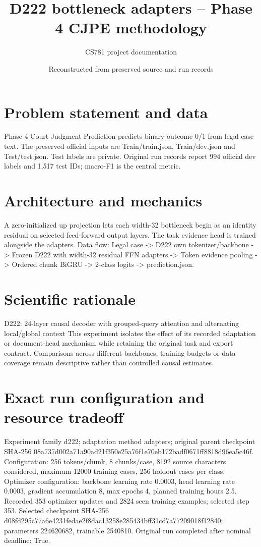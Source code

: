 \documentclass[11pt,a4paper]{article}
\begin{document}
\title{D222 bottleneck adapters -- Phase 4 CJPE methodology}
\author{CS781 project documentation}
\date{Reconstructed from preserved source and run records}
\maketitle
\section{Problem statement and data}
Phase 4 Court Judgment Prediction predicts binary outcome 0/1 from legal case text. The preserved official inputs are Train/train.json, Train/dev.json and Test/test.json. Test labels are private. Original run records report 994 official dev labels and 1,517 test IDs; macro-F1 is the central metric.
\section{Architecture and mechanics}
A zero-initialized up projection lets each width-32 bottleneck begin as an identity residual on selected feed-forward output layers. The task evidence head is trained alongside the adapters. Data flow: Legal case -> D222 own tokenizer/backbone -> Frozen D222 with width-32 residual FFN adapters -> Token evidence pooling -> Ordered chunk BiGRU -> 2-class logits -> prediction.json.
\section{Scientific rationale}
D222: 24-layer causal decoder with grouped-query attention and alternating local/global context This experiment isolates the effect of its recorded adaptation or document-head mechanism while retaining the original task and export contract. Comparisons across different backbones, training budgets or data coverage remain descriptive rather than controlled causal estimates.
\section{Exact run configuration and resource tradeoff}
Experiment family d222; adaptation method adapters; original parent checkpoint SHA-256 08a737d002a71a90ad21f350e25a76f1e70eb172badf0671ff8818d96ea5c46f. Configuration: 256 tokens/chunk, 8 chunks/case, 8192 source characters considered, maximum 12000 training cases, 256 holdout cases per class. Optimizer configuration: backbone learning rate 0.0003, head learning rate 0.0003, gradient accumulation 8, max epochs 4, planned training hours 2.5. Recorded 353 optimizer updates and 2824 seen training examples; selected step 353. Selected checkpoint SHA-256 d08fd295c77a6e4231fedae2f8dac13258e285434bff31cd7a77209018f12840; parameters 224620682, trainable 2540810. Original run completed after nominal deadline: True.
\end{document}

